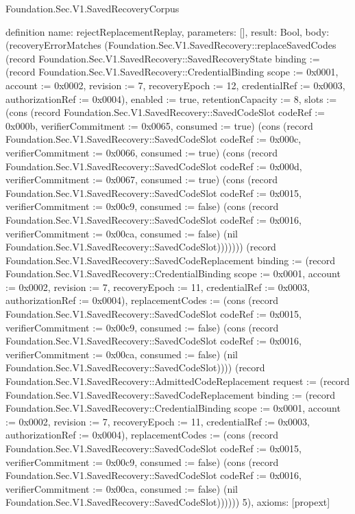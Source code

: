 \begin{lexlean}{Foundation.Sec.V1.SavedRecoveryCorpus}
\begin{semanticmodule}
definition{
  name: rejectReplacementReplay,
  parameters: [],
  result: Bool,
  body: (recoveryErrorMatches (Foundation.Sec.V1.SavedRecovery::replaceSavedCodes (record Foundation.Sec.V1.SavedRecovery::SavedRecoveryState {binding := (record Foundation.Sec.V1.SavedRecovery::CredentialBinding {scope := 0x0001, account := 0x0002, revision := 7, recoveryEpoch := 12, credentialRef := 0x0003, authorizationRef := 0x0004}), enabled := true, retentionCapacity := 8, slots := (cons (record Foundation.Sec.V1.SavedRecovery::SavedCodeSlot {codeRef := 0x000b, verifierCommitment := 0x0065, consumed := true}) (cons (record Foundation.Sec.V1.SavedRecovery::SavedCodeSlot {codeRef := 0x000c, verifierCommitment := 0x0066, consumed := true}) (cons (record Foundation.Sec.V1.SavedRecovery::SavedCodeSlot {codeRef := 0x000d, verifierCommitment := 0x0067, consumed := true}) (cons (record Foundation.Sec.V1.SavedRecovery::SavedCodeSlot {codeRef := 0x0015, verifierCommitment := 0x00c9, consumed := false}) (cons (record Foundation.Sec.V1.SavedRecovery::SavedCodeSlot {codeRef := 0x0016, verifierCommitment := 0x00ca, consumed := false}) (nil Foundation.Sec.V1.SavedRecovery::SavedCodeSlot))))))}) (record Foundation.Sec.V1.SavedRecovery::SavedCodeReplacement {binding := (record Foundation.Sec.V1.SavedRecovery::CredentialBinding {scope := 0x0001, account := 0x0002, revision := 7, recoveryEpoch := 11, credentialRef := 0x0003, authorizationRef := 0x0004}), replacementCodes := (cons (record Foundation.Sec.V1.SavedRecovery::SavedCodeSlot {codeRef := 0x0015, verifierCommitment := 0x00c9, consumed := false}) (cons (record Foundation.Sec.V1.SavedRecovery::SavedCodeSlot {codeRef := 0x0016, verifierCommitment := 0x00ca, consumed := false}) (nil Foundation.Sec.V1.SavedRecovery::SavedCodeSlot)))}) (record Foundation.Sec.V1.SavedRecovery::AdmittedCodeReplacement {request := (record Foundation.Sec.V1.SavedRecovery::SavedCodeReplacement {binding := (record Foundation.Sec.V1.SavedRecovery::CredentialBinding {scope := 0x0001, account := 0x0002, revision := 7, recoveryEpoch := 11, credentialRef := 0x0003, authorizationRef := 0x0004}), replacementCodes := (cons (record Foundation.Sec.V1.SavedRecovery::SavedCodeSlot {codeRef := 0x0015, verifierCommitment := 0x00c9, consumed := false}) (cons (record Foundation.Sec.V1.SavedRecovery::SavedCodeSlot {codeRef := 0x0016, verifierCommitment := 0x00ca, consumed := false}) (nil Foundation.Sec.V1.SavedRecovery::SavedCodeSlot)))})})) 5),
  axioms: [propext]
}


\end{semanticmodule}
\end{lexlean}
